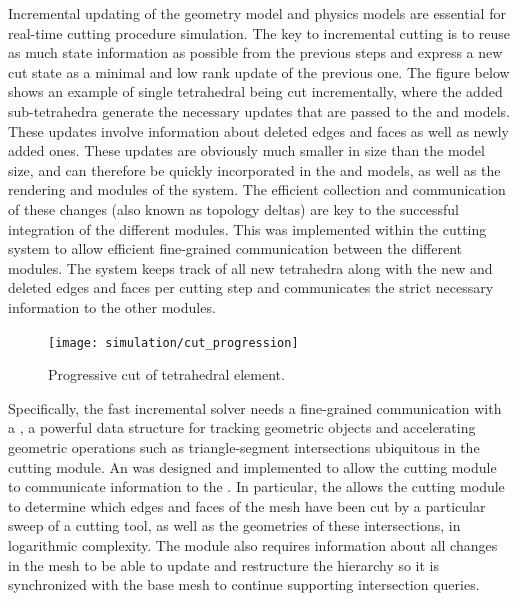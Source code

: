Incremental updating of the  geometry model and  physics models are essential for real-time cutting procedure simulation. The key to incremental cutting is to reuse as much state information as possible from the previous steps and express a new cut state as a minimal and low rank update of the previous one. The figure below shows an example of single tetrahedral being cut incrementally, where the added sub-tetrahedra generate the necessary updates that are passed to the  and  models. These updates involve information about deleted edges and faces as well as newly added ones. These updates are obviously much smaller in size than the model size, and can therefore be quickly incorporated in the  and  models, as well as the rendering and  modules of the system. The efficient collection and communication of these changes (also known as topology deltas) are key to the successful integration of the different modules. This was implemented within the cutting system to allow efficient fine-grained communication between the different modules. The system keeps track of all new tetrahedra along with the new and deleted edges and faces per cutting step and communicates the strict necessary information to the other modules.



\begin{figure}
  \centering%
  \texttt{[image: simulation/cut\_progression]}
  \caption{Progressive cut of tetrahedral element.}\label{fig:discontinuous_tetrahedra_solver}
\end{figure}

Specifically, the fast incremental solver needs a fine-grained communication with a , a powerful data structure for tracking geometric objects and accelerating geometric operations such as triangle-segment intersections ubiquitous in the cutting module. An  was designed and implemented to allow the cutting module to communicate information to the . In particular, the   allows the cutting module to determine which edges and faces of the mesh have been cut by a particular sweep of a cutting tool, as well as the geometries of these intersections, in logarithmic complexity. The  module also requires information about all changes in the mesh to be able to update and restructure the hierarchy so it is synchronized with the base mesh to continue supporting intersection queries.



